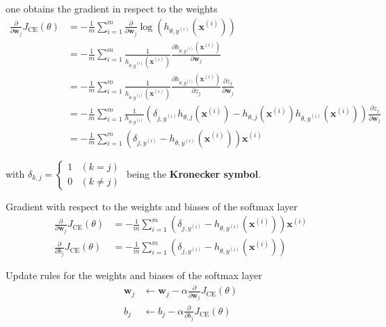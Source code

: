 \documentclass[11pt]{article}
\begin{document}
\noindent
one obtains the gradient in respect to the weights
\begin{align*}
	\frac{\partial}{\partial \textbf{w}_j} J_{\text{CE}}(\theta) &= -\frac{1}{m} \sum_{i=1}^{m}\frac{\partial}{\partial \textbf{w}_j}\log\left(h_{\theta, y^{(i)}} (\textbf{x}^{(i)}) \right)\\
	&= -\frac{1}{m} \sum_{i=1}^{m}\frac{1}{h_{\theta, y^{(i)}} (\textbf{x}^{(i)})}\frac{\partial h_{\theta, y^{(i)}} (\textbf{x}^{(i)})}{\partial\textbf{w}_j}\\
	&= -\frac{1}{m} \sum_{i=1}^{m}\frac{1}{h_{\theta, y^{(i)}} (\textbf{x}^{(i)})}\frac{\partial h_{\theta, y^{(i)}} (\textbf{x}^{(i)})}{\partial z_j}\frac{\partial z_j}{\partial\textbf{w}_j}\\
	&= -\frac{1}{m} \sum_{i=1}^{m}\frac{1}{h_{\theta, y^{(i)}}} \left( \delta_{j, y^{(i)}} h_{\theta, j}(\textbf{x}^{(i)}) - h_{\theta, j} (\textbf{x}^{(i)}) h_{\theta, y^{(i)}}(\textbf{x}^{(i)}) \right) \frac{\partial z_j}{\partial\textbf{w}_j}\\
	&= -\frac{1}{m} \sum_{i=1}^{m}\left( \delta_{j, y^{(i)}} - h_{\theta, y^{(i)}} (\textbf{x}^{(i)}) \right)\textbf{x}^{(i)}
\end{align*}

\noindent
with $\delta_{k,j} = \left\{ \begin{matrix}
	1 & (k=j)\\
	0 & (k\neq j)
\end{matrix} \right.$ being the \textbf{Kronecker symbol}.

\vspace{1em}
\noindent
Gradient with respect to the weights and biases of the softmax layer
\begin{align*}
	\frac{\partial}{\partial \textbf{w}_j} J_{\text{CE}}(\theta) &= -\frac{1}{m} \sum_{i=1}^{m}\left( \delta_{j, y^{(i)}} - h_{\theta, y^{(i)}} (\textbf{x}^{(i)}) \right)\textbf{x}^{(i)}\\
	\frac{\partial}{\partial b_j} J_{\text{CE}}(\theta) &= -\frac{1}{m} \sum_{i=1}^{m}\left( \delta_{j, y^{(i)}} - h_{\theta, y^{(i)}} (\textbf{x}^{(i)}) \right)
\end{align*}

\vspace{1em}
\noindent
Update rules for the weights and biases of the softmax layer
\begin{align*}
	\textbf{w}_j &\leftarrow \textbf{w}_j - \alpha\frac{\partial}{\partial\textbf{w}_j}J_{\text{CE}}(\theta)\\
	b_j &\leftarrow b_j - \alpha\frac{\partial}{\partial b_j}J_{\text{CE}}(\theta)
\end{align*}
\end{document}
